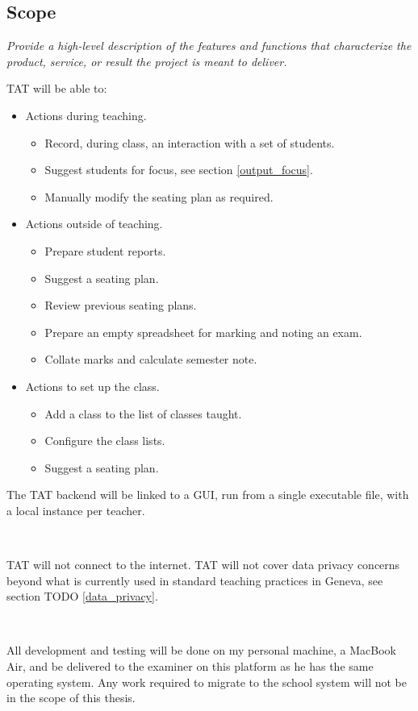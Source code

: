 \documentclass[10pt]{article}
\begin{document}
\subsection{Scope} 
\emph{Provide a high-level description of the features and functions that characterize the product, service, or result the project is meant to deliver.}

TAT will be able to:
\begin{itemize}
\item Actions during teaching.
\begin{itemize}
  \item Record, during class, an interaction with a set of students.
  \item Suggest students for focus, see section \ref{output_focus}.
  \item Manually modify the seating plan as required.
 \end{itemize}
 \item Actions outside of teaching.
 \begin{itemize}
  \item Prepare student reports.
  \item Suggest a seating plan.
  \item Review previous seating plans.
  \item Prepare an empty spreadsheet for marking and noting an exam.
  \item Collate marks and calculate semester note.
\end{itemize}
\item Actions to set up the class.
\begin{itemize}
  \item Add a class to the list of classes taught.
  \item Configure the class lists.
  \item Suggest a seating plan.
\end{itemize}
\end{itemize}

The TAT backend will be linked to a GUI, run from a single executable file, with a local instance per teacher.

\

TAT will not connect to the internet. TAT will not cover data privacy concerns beyond what is currently used in standard teaching practices in Geneva, see section TODO \ref{data_privacy}.

\

All development and testing will be done on my personal machine, a MacBook Air, and be delivered to the examiner on this platform as he has the same operating system. Any work required to migrate to the school system will not be in the scope of this thesis.
\end{document}
